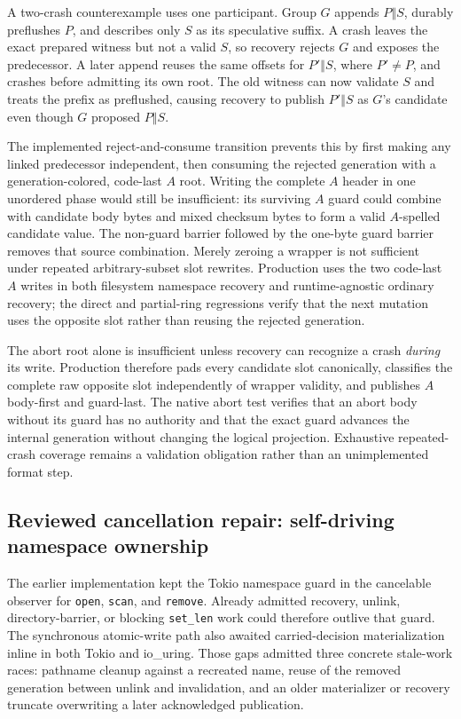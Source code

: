 \documentclass[10pt,twocolumn]{article}
\theoremstyle{remark}
\newcommand{\code}[1]{\texttt{#1}}
\begin{document}
A two-crash counterexample uses one participant. Group $G$ appends $P\mathbin\Vert S$, durably
preflushes $P$, and describes only $S$ as its speculative suffix. A crash leaves the exact prepared
witness but not a valid $S$, so recovery rejects $G$ and exposes the predecessor. A later append
reuses the same offsets for $P'\mathbin\Vert S$, where $P'\ne P$, and crashes before admitting its
own root. The old witness can now validate $S$ and treats the prefix as preflushed, causing recovery
to publish $P'\mathbin\Vert S$ as $G$'s candidate even though $G$ proposed $P\mathbin\Vert S$.

The implemented reject-and-consume transition prevents this by first making any linked predecessor
independent, then consuming the rejected generation with a generation-colored, code-last $A$ root.
Writing the complete $A$ header in one unordered phase would still be insufficient: its surviving
$A$ guard could combine with candidate body bytes and mixed checksum bytes to form a valid
$A$-spelled candidate value. The non-guard barrier followed by the one-byte guard barrier removes
that source combination. Merely
zeroing a wrapper is not sufficient under repeated arbitrary-subset slot rewrites. Production uses
the two code-last $A$ writes in both filesystem namespace recovery and runtime-agnostic ordinary
recovery; the direct and partial-ring regressions verify that the next mutation uses the opposite
slot rather than reusing the rejected generation.

The abort root alone is insufficient unless recovery can recognize a crash \emph{during} its
write. Production therefore pads every candidate slot canonically, classifies the complete raw
opposite slot independently of wrapper validity, and publishes $A$ body-first and guard-last. The
native abort test verifies that an abort body without its guard has no authority and that the exact
guard advances the internal generation without changing the logical projection. Exhaustive
repeated-crash coverage remains a validation obligation rather than an unimplemented format step.

\subsection{Reviewed cancellation repair: self-driving namespace ownership}

The earlier implementation kept the Tokio namespace guard in the cancelable observer for
\code{open}, \code{scan}, and \code{remove}. Already admitted recovery, unlink, directory-barrier,
or blocking \code{set\_len} work could therefore outlive that guard. The synchronous atomic-write
path also awaited carried-decision materialization inline in both Tokio and io\_uring. Those gaps
admitted three concrete stale-work races: pathname cleanup against a recreated name, reuse of the
removed generation between unlink and invalidation, and an older materializer or recovery truncate
overwriting a later acknowledged publication.
\end{document}
